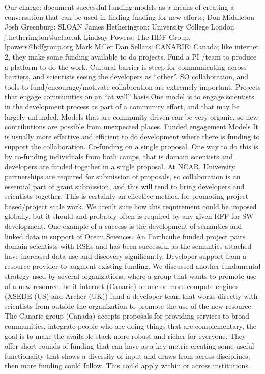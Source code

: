 Our charge: document successful funding models as a means of creating a conversation that can be used in finding funding for new efforts;
Don Middleton
Josh Greenburg: SLOAN
James Hetherington: University College London j.hetherington@ucl.ac.uk
Lindsay Powers: The HDF Group, lpowers@hdfgroup.org
Mark Miller
Dan Sellars: CANARIE: Canada; like internet 2, they make some funding available to do projects.
Fund a PI /team to produce a platform to do the work.
Cultural barrier is steep for communicating across barriers, and scientists seeing the developers as “other”. SO collaboration, and tools to fund/encourage/motivate collaboration are extremely important.
Projects that engage communities on an “at will” basis
One model is to engage scientists in the development process as part of a community effort, and that may be largely unfunded. Models that are community driven can be very organic, so new contributions are possible from unexpected places.
Funded engagement Models
It is usually more effective and efficient to do development where there is funding to support the collaboration.
Co-funding on a single proposal.
One way to do this is by co-funding individuals from both camps, that is domain scientists and developers are funded together in a single proposal. At NCAR, University partnerships are required for submission of proposals, so collaboration is an essential part of grant submission, and this will tend to bring developers and scientists together. This is certainly an effective method for promoting project based/project scale work. We aren’t sure how this requirement could be imposed globally, but it should and probably often is required by any given RFP for SW development. One example of a success is the development of semantics and linked data in support of Ocean Sciences. An Earthcube funded project pairs domain scientists with RSEs and has been successful as the semantics attached have increased data use and discovery significantly.
Developer support from a resource provider to augment existing funding.
We discussed another fundamental strategy used by several organizations, where a group that wants to promote use of a new resource, be it internet (Canarie) or one or more compute engines (XSEDE (US) and Archer (UK)) fund a developer team that works directly with scientists from outside the organization to promote the use of the new resource.
The Canarie group (Canada) accepts proposals for providing services to broad communities, integrate people who are doing things that are complementary, the goal is to make the available stack more robust and richer for everyone. They offer short rounds of funding that can have as a key metric creating some useful functionality that shows a diversity of input and draws from across disciplines, then more funding could follow. This could apply within or across institutions.
